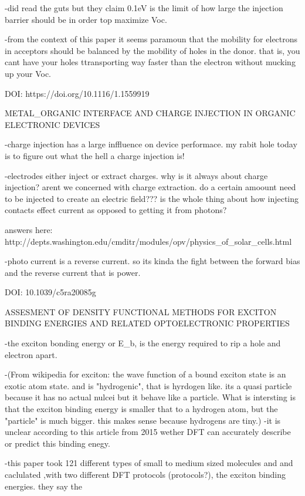    -did read the guts but they claim 0.1eV is the limit of how large the injection barrier should be
        in order top maximize Voc. 

    -from the context of this paper it seems paramoun that the mobility for electrons in acceptors
    should be balanced by the mobility of holes in the donor. that is, you cant have your holes 
    ttransporting way faster than the electron without mucking up your Voc.
    

DOI: https://doi.org/10.1116/1.1559919

        METAL_ORGANIC INTERFACE AND CHARGE INJECTION IN ORGANIC ELECTRONIC DEVICES

    -charge injection has a large inffluence on device performace. my rabit hole today is to figure out 
    what the hell a charge injection is!

    -electrodes either inject or extract charges. why is it always about charge injection? arent we 
    concerned with charge  extraction. do a certain amoount need to be injected to create an electric
    field??? is the whole thing about how injecting contacts effect current as opposed to getting it
    from photons?

    answers here: http://depts.washington.edu/cmditr/modules/opv/physics_of_solar_cells.html

        -photo current is a reverse current. so its kinda the fight between the forward bias and
        the reverse current that is power. 

DOI: 10.1039/c5ra20085g

        ASSESMENT OF DENSITY FUNCTIONAL METHODS FOR EXCITON BINDING ENERGIES AND RELATED
        OPTOELECTRONIC PROPERTIES

    -the exciton bonding energy or E_{b}, is the energy required to rip a hole and electron apart. 

    -(From wikipedia for exciton: the wave function of a bound exciton state is an exotic atom 
        state. and is "hydrogenic", that is hyrdogen like. its a quasi particle because it has no 
        actual nulcei but it behave like a particle. What is intersting is that the exciton binding
        energy is smaller that to a hydrogen atom, but the "particle" is much bigger. this makes
        sense because hydrogens are tiny.)
    -it is unclear according to this article from 2015 wether DFT can accurately describe or 
    predict this binding enegy. 

    -this paper took 121 different types of small to medium sized molecules and and caclulated
    ,with two different DFT protocols (protocols?), the exciton binding energies. they say
    the 

